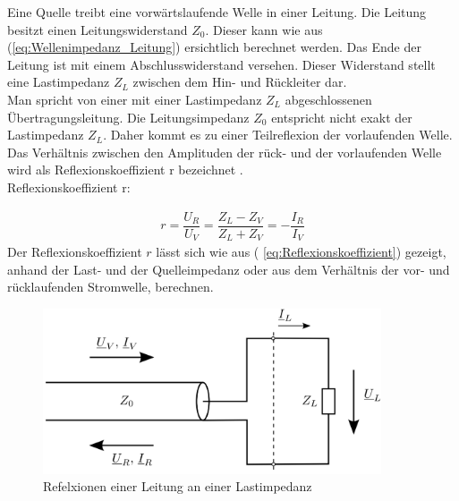 Eine Quelle treibt eine vorwärtslaufende Welle in einer Leitung. Die Leitung besitzt einen Leitungswiderstand $Z_0$. Dieser kann wie aus  (\ref{eq:Wellenimpedanz_Leitung}) ersichtlich berechnet werden. Das Ende der Leitung ist mit einem Abschlusswiderstand versehen. Dieser Widerstand stellt eine Lastimpedanz $Z_L$ zwischen dem Hin- und Rückleiter dar. \\
Man spricht von einer mit einer Lastimpedanz $Z_L$ abgeschlossenen Übertragungsleitung.  Die Leitungsimpedanz $Z_0$ entspricht nicht exakt der Lastimpedanz $Z_L$. Daher kommt es zu einer   Teilreflexion der vorlaufenden Welle. Das Verhältnis zwischen den Amplituden der rück- und der vorlaufenden Welle wird als Reflexionskoeffizient r bezeichnet \cite{Tekom}. \\

Reflexionskoeffizient r:

\begin{eqnarray}\label{eq:Reflexionskoeffizient}
r=\dfrac{U_{R}}{U_{V}}=\dfrac{Z_{L}-Z_{V}}{Z_{L}+Z_{V}}=-\dfrac{I_{R}}{I_{V}}
\end{eqnarray}
Der Reflexionskoeffizient $r$ lässt sich wie aus ( \ref{eq:Reflexionskoeffizient}) gezeigt, anhand der Last- und der Quelleimpedanz oder aus dem Verhältnis der vor- und rücklaufenden Stromwelle, berechnen.

\begin{figure}[!ht]
	\centering
	\includegraphics[width=10cm]{content/bilder/ReflexionenLeitungLastimpedanz.pdf}%
	\caption{Refelxionen einer Leitung an einer Lastimpedanz \cite{Tekom}}
	\label{LeitungMit_ZL}
\end{figure}


